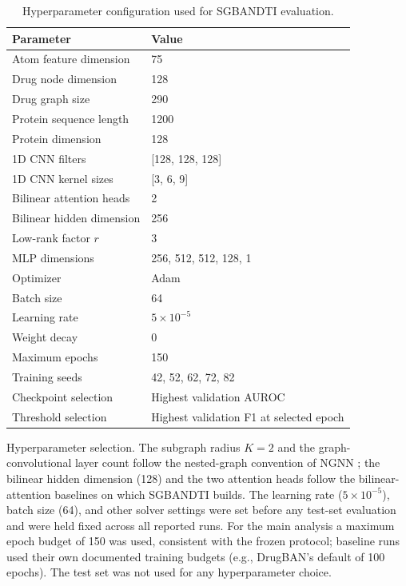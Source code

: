 \documentclass[computers,article,submit,moreauthors]{Definitions/mdpi}
\begin{document}
\begin{table}[H]
\caption{Hyperparameter configuration used for SGBANDTI evaluation.}
\label{tab:hyperparameter_config}
\begin{tabular*}{\textwidth}{@{\extracolsep{\fill}}ll@{}}
\toprule
\textbf{Parameter} & \textbf{Value} \\
\midrule
Atom feature dimension & 75 \\
Drug node dimension & 128 \\
Drug graph size & 290 \\
Protein sequence length & 1200 \\
Protein dimension & 128 \\
1D CNN filters & [128, 128, 128] \\
1D CNN kernel sizes & [3, 6, 9] \\
Bilinear attention heads & 2 \\
Bilinear hidden dimension & 256 \\
Low-rank factor $r$ & 3 \\
MLP dimensions & 256, 512, 512, 128, 1 \\
Optimizer & Adam \\
Batch size & 64 \\
Learning rate & $5 \times 10^{-5}$ \\
Weight decay & 0 \\
Maximum epochs & 150 \\
Training seeds & 42, 52, 62, 72, 82 \\
Checkpoint selection & Highest validation AUROC \\
Threshold selection & Highest validation F1 at selected epoch \\
\bottomrule
\end{tabular*}
\end{table}

Hyperparameter selection. The subgraph radius $K=2$ and the graph-convolutional layer count follow the nested-graph convention of NGNN \citep{zhang2021ngnn}; the bilinear hidden dimension (128) and the two attention heads follow the bilinear-attention baselines on which SGBANDTI builds. The learning rate ($5 \times 10^{-5}$), batch size (64), and other solver settings were set before any test-set evaluation and were held fixed across all reported runs. For the main analysis a maximum epoch budget of 150 was used, consistent with the frozen protocol; baseline runs used their own documented training budgets (e.g., DrugBAN's default of 100 epochs). The test set was not used for any hyperparameter choice.
\end{document}
